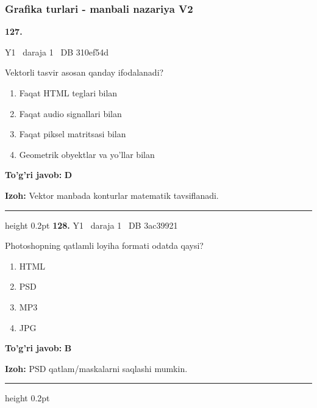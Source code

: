 \documentclass[10pt,a4paper,oneside]{article}
\begin{document}
\subsubsection{Grafika turlari - manbali nazariya V2}
\hypertarget{q127}{\textbf{\color{ink}127.}}  {\color{muted}\scriptsize Y1 \textbullet\ daraja 1 \textbullet\ DB 310ef54d}
\par
Vektorli tasvir asosan qanday ifodalanadi?
\begin{enumerate}[label=\Alph*),leftmargin=9mm]
\item Faqat HTML teglari bilan
\item Faqat audio signallari bilan
\item Faqat piksel matritsasi bilan
\item Geometrik obyektlar va yo'llar bilan
\end{enumerate}
\begin{tcolorbox}[enhanced,breakable,colback=teal!4,colframe=teal!45!black,boxrule=0.45pt,arc=1.2mm,left=2.8mm,right=2.8mm,top=2mm,bottom=2mm,before skip=2mm,after skip=2mm]
\textbf{\color{teal}To'g'ri javob:} \textbf{D}
\par\smallskip
\textbf{Izoh:} Vektor manbada konturlar matematik tavsiflanadi.
\end{tcolorbox}
\vspace{2mm}\hrule height 0.2pt \vspace{4mm}
\hypertarget{q128}{\textbf{\color{ink}128.}}  {\color{muted}\scriptsize Y1 \textbullet\ daraja 1 \textbullet\ DB 3ac39921}
\par
Photoshopning qatlamli loyiha formati odatda qaysi?
\begin{enumerate}[label=\Alph*),leftmargin=9mm]
\item HTML
\item PSD
\item MP3
\item JPG
\end{enumerate}
\begin{tcolorbox}[enhanced,breakable,colback=teal!4,colframe=teal!45!black,boxrule=0.45pt,arc=1.2mm,left=2.8mm,right=2.8mm,top=2mm,bottom=2mm,before skip=2mm,after skip=2mm]
\textbf{\color{teal}To'g'ri javob:} \textbf{B}
\par\smallskip
\textbf{Izoh:} PSD qatlam/maskalarni saqlashi mumkin.
\end{tcolorbox}
\vspace{2mm}\hrule height 0.2pt \vspace{4mm}
\end{document}
